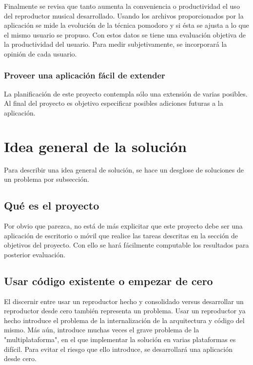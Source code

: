 \documentclass[12pt,letterpaper]{report}
\begin{document}
Finalmente se revisa que tanto aumenta la conveniencia o productividad
el uso del reproductor musical desarrollado. Usando los archivos
proporcionados por la aplicación se mide la evolución de la técnica
pomodoro y si ésta se ajusta a lo que el mismo usuario se propuso. Con
estos datos se tiene una evaluación objetiva de la productividad del
usuario. Para medir subjetivamente, se incorporará la opinión de cada
usuario.

\hypertarget{proveer-una-aplicaciuxf3n-fuxe1cil-de-extender}{%
\subsubsection{Proveer una aplicación fácil de
extender}\label{proveer-una-aplicaciuxf3n-fuxe1cil-de-extender}}

La planificación de este proyecto contempla sólo una extensión de varias
posibles. Al final del proyecto es objetivo especificar posibles
adiciones futuras a la aplicación.

\newpage
\hypertarget{idea-general-de-la-soluciuxf3n}{%
\section{Idea general de la
solución}\label{idea-general-de-la-soluciuxf3n}}

Para describir una idea general de solución, se hace un desglose de
soluciones de un problema por subsección.

\hypertarget{quuxe9-es-el-proyecto}{%
\subsection{Qué es el proyecto}\label{quuxe9-es-el-proyecto}}

Por obvio que parezca, no está de más explicitar que este proyecto debe
ser una aplicación de escritorio o móvil que realice las tareas
descritas en la sección de objetivos del proyecto. Con ello se hará
fácilmente computable los resultados para posterior evaluación.

\hypertarget{usar-cuxf3digo-existente-o-empezar-de-cero}{%
\subsection{Usar código existente o empezar de
cero}\label{usar-cuxf3digo-existente-o-empezar-de-cero}}

El discernir entre usar un reproductor hecho y consolidado versus
desarrollar un reproductor desde cero también representa un problema.
Usar un reproductor ya hecho introduce el problema de la internalización
de la arquitectura y código del mismo. Más aún, introduce muchas veces
el grave problema de la "multiplataforma", en el que implementar la
solución en varias plataformas es difícil. Para evitar el riesgo que
ello introduce, se desarrollará una aplicación desde cero.
\end{document}
